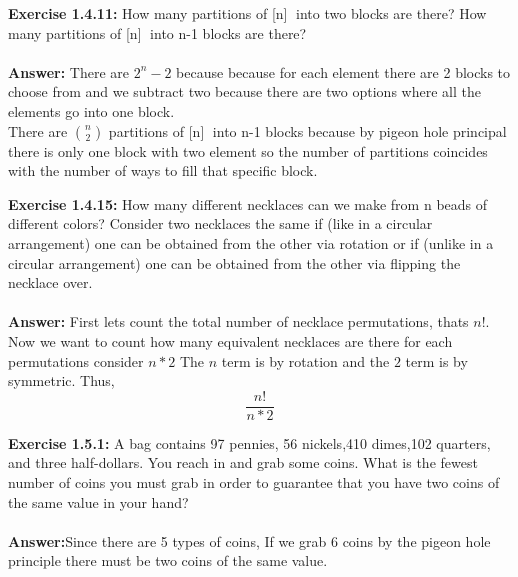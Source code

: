 \documentclass{amsart}
\begin{document}
\noindent\textbf{Exercise 1.4.11:} How many partitions of [n]􏰊 into two blocks are there? How many partitions of [n] 􏰊into n-1 blocks are there?\\\\
\noindent \textbf{Answer:} There are $2^{n}-2$ because because for each element there are 2 blocks to choose from and we subtract two because there are two options where all the elements go into one block.\\
There are $n \choose 2$ partitions of [n] 􏰊into n-1 blocks because by pigeon hole principal there is only one block with two element so the number of partitions coincides with the number of ways to fill that specific block.
\vspace{1in}



\noindent\textbf{Exercise 1.4.15: } How many different necklaces can we make from n beads of different colors? Consider two necklaces the same if (like in a circular arrangement) one can be obtained from the other via rotation or if (unlike in a circular arrangement) one can be obtained from the other via flipping the necklace over.\\\\

\noindent \textbf{Answer:} First lets count the total number of  necklace permutations, thats $n!$. Now we want to count how many equivalent necklaces are there for each permutations consider $n*2$ The $n$ term is by rotation and the $2$ term is by symmetric. Thus,
\begin{equation}
\frac{n!}{n*2}
\end{equation}
\vspace{1in}

\noindent\textbf{Exercise 1.5.1: } A bag contains 97 pennies, 56 nickels,410 dimes,102 quarters, and three half-dollars. You reach in and grab some coins. What is the fewest number of coins you must grab in order to guarantee that you have two coins of the same value in your hand?\\\\
\noindent \textbf{Answer:}Since there are 5 types of coins, If we grab 6 coins by the pigeon hole principle there must be two coins of the same value.\\
\vspace{1in}
\end{document}
